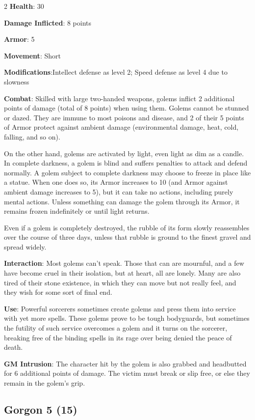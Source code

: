 \begin{multicols}{2}
\textbf{Health}: 30

\textbf{Damage Inflicted}: 8 points

\textbf{Armor}: 5

\textbf{Movement}: Short

\textbf{Modifications}:Intellect defense as level 2; Speed defense as level 4 due to slowness

\textbf{Combat}: Skilled with large two-handed weapons, golems inflict 2 additional points of damage (total of 8 points) when using them. Golems cannot be stunned or dazed. They are immune to most poisons and disease, and 2 of their 5 points of Armor protect against ambient damage (environmental damage, heat, cold, falling, and so on).

On the other hand, golems are activated by light, even light as dim as a candle. In complete darkness, a golem is blind and suffers penalties to attack and defend normally. A golem subject to complete darkness may choose to freeze in place like a statue. When one does so, its Armor increases to 10 (and Armor against ambient damage increases to 5), but it can take no actions, including purely mental actions. Unless something can damage the golem through its Armor, it remains frozen indefinitely or until light returns.

Even if a golem is completely destroyed, the rubble of its form slowly reassembles over the course of three days, unless that rubble is ground to the finest gravel and spread widely.

\textbf{Interaction}: Most golems can’t speak. Those that can are mournful, and a few have become cruel in their isolation, but at heart, all are lonely. Many are also tired of their stone existence, in which they can move but not really feel, and they wish for some sort of final end.

\textbf{Use}: Powerful sorcerers sometimes create golems and press them into service with yet more spells. These golems prove to be tough bodyguards, but sometimes the futility of such service overcomes a golem and it turns on the sorcerer, breaking free of the binding spells in its rage over being denied the peace of death.

\textbf{GM Intrusion}: The character hit by the golem is also grabbed and headbutted for 6 additional points of damage. The victim must break or slip free, or else they remain in the golem’s grip.

\subsection{Gorgon 5 (15)}


\end{multicols}
